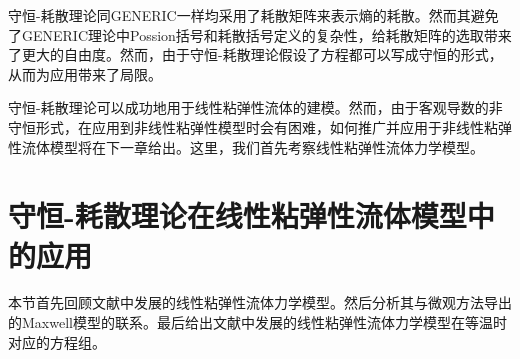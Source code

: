 	守恒-耗散理论同GENERIC一样均采用了耗散矩阵来表示熵的耗散。然而其避免了GENERIC理论中Possion括号和耗散括号定义的复杂性，给耗散矩阵的选取带来了更大的自由度。然而，由于守恒-耗散理论假设了方程都可以写成守恒的形式，从而为应用带来了局限。

	守恒-耗散理论可以成功地用于线性粘弹性流体的建模。然而，由于客观导数的非守恒形式，在应用到非线性粘弹性模型时会有困难，如何推广并应用于非线性粘弹性流体模型将在下一章给出。这里，我们首先考察线性粘弹性流体力学模型。

	\section{守恒-耗散理论在线性粘弹性流体模型中的应用}
	本节首先回顾文献\cite{zhu2014conservation}中发展的线性粘弹性流体力学模型。然后分析其与微观方法导出的Maxwell模型的联系。最后给出文献\cite{zhu2014conservation}中发展的线性粘弹性流体力学模型在等温时对应的方程组。
